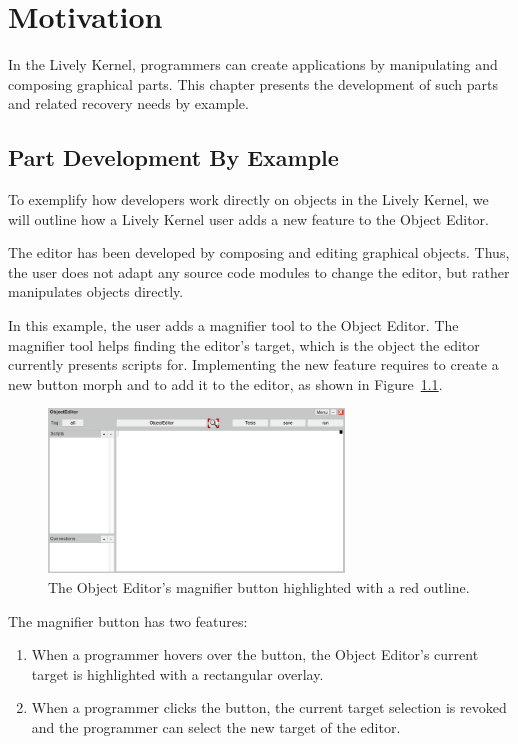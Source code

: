 \chapter{Motivation} \label{chapter:MOTIVATION}

In the Lively Kernel, programmers can create applications by manipulating and composing graphical parts.
This chapter presents the development of such parts and related recovery needs by example.


\section{Part Development By Example}

To exemplify how developers work directly on objects in the Lively Kernel, we will outline how a Lively Kernel user adds a new feature to the Object Editor.

The editor has been developed by composing and editing graphical objects.
Thus, the user does not adapt any source code modules to change the editor, but rather manipulates objects directly.

In this example, the user adds a magnifier tool to the Object Editor.
The magnifier tool helps finding the editor's target, which is the object the editor currently presents scripts for.
Implementing the new feature requires to create a new button morph and to add it to the editor, as shown in Figure~\ref{fig:MagnifierButton}.

\begin{figure}[h]
    \centering
    \includegraphics[width=0.7\textwidth]{figures/3_motivation/1_magnifierButton.png}
    \caption{The Object Editor's magnifier button highlighted with a red outline.}
    \label{fig:MagnifierButton}
\end{figure}

The magnifier button has two features:
\begin{enumerate}
    \item When a programmer hovers over the button, the Object Editor's current target is highlighted with a rectangular overlay.
    \item When a programmer clicks the button, the current target selection is revoked and the programmer can select the new target of the editor.
\end{enumerate}

